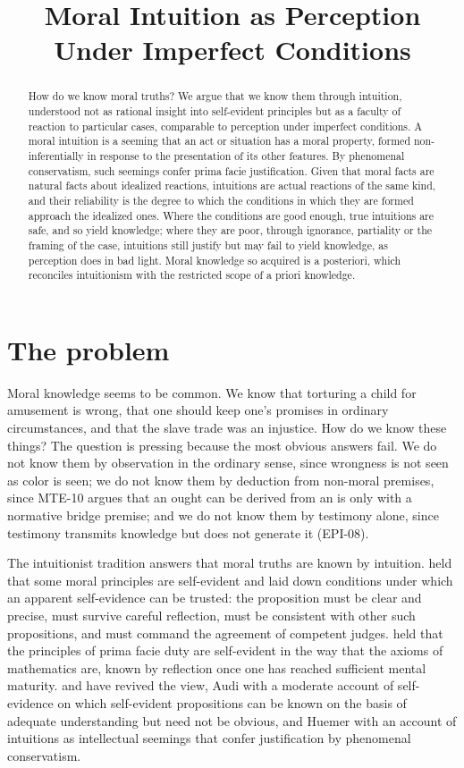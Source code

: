 \documentclass{situationist-preprint}
\title{Moral Intuition as Perception Under Imperfect Conditions}
\begin{document}
\maketitle

\begin{abstract}
How do we know moral truths? We argue that we know them through intuition, understood not as rational insight into self-evident principles but as a faculty of reaction to particular cases, comparable to perception under imperfect conditions. A moral intuition is a seeming that an act or situation has a moral property, formed non-inferentially in response to the presentation of its other features. By phenomenal conservatism, such seemings confer prima facie justification. Given that moral facts are natural facts about idealized reactions, intuitions are actual reactions of the same kind, and their reliability is the degree to which the conditions in which they are formed approach the idealized ones. Where the conditions are good enough, true intuitions are safe, and so yield knowledge; where they are poor, through ignorance, partiality or the framing of the case, intuitions still justify but may fail to yield knowledge, as perception does in bad light. Moral knowledge so acquired is a posteriori, which reconciles intuitionism with the restricted scope of a priori knowledge.
\end{abstract}

\section{The problem}

Moral knowledge seems to be common. We know that torturing a child for amusement is wrong, that one should keep one's promises in ordinary circumstances, and that the slave trade was an injustice. How do we know these things? The question is pressing because the most obvious answers fail. We do not know them by observation in the ordinary sense, since wrongness is not seen as color is seen; we do not know them by deduction from non-moral premises, since MTE-10 argues that an ought can be derived from an is only with a normative bridge premise; and we do not know them by testimony alone, since testimony transmits knowledge but does not generate it (EPI-08).

The intuitionist tradition answers that moral truths are known by intuition. \citet{Sidgwick1907} held that some moral principles are self-evident and laid down conditions under which an apparent self-evidence can be trusted: the proposition must be clear and precise, must survive careful reflection, must be consistent with other such propositions, and must command the agreement of competent judges. \citet{Ross1930} held that the principles of prima facie duty are self-evident in the way that the axioms of mathematics are, known by reflection once one has reached sufficient mental maturity. \citet{Audi2004} and \citet{Huemer2005} have revived the view, Audi with a moderate account of self-evidence on which self-evident propositions can be known on the basis of adequate understanding but need not be obvious, and Huemer with an account of intuitions as intellectual seemings that confer justification by phenomenal conservatism.
\end{document}
